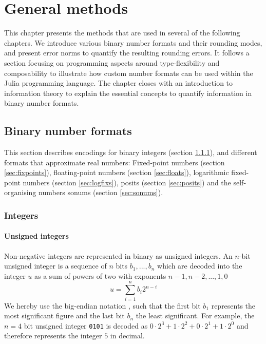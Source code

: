 \chapter{General methods}
\label{chap:methods}

This chapter presents the methods that are used in several of the following chapters. We introduce various binary number formats and
their rounding modes, and present error norms to quantify the resulting rounding errors. It follows a section focusing on
programming aspects around type-flexibility and composability to illustrate how custom number formats can be used within
the Julia programming language. The chapter closes with an introduction to information theory to explain the essential concepts
to quantify information in binary number formats.

\section{Binary number formats}
\label{sec:numbers}

This section describes encodings for binary integers (section \ref{sec:integers}), and different formats that approximate real numbers:
Fixed-point numbers (section \ref{sec:fixpoints}),
floating-point numbers (section \ref{sec:floats}),
logarithmic fixed-point numbers (section \ref{sec:logfixs}),
posits (section \ref{sec:posits}) and the self-organising numbers sonums (section \ref{sec:sonums}).

\subsection{Integers}
\label{sec:integers}

\subsubsection{Unsigned integers}

Non-negative integers are represented in binary as unsigned integers. An $n$-bit unsigned integer is a sequence of $n$ bits
$b_1, ..., b_n$ which are decoded into the integer $u$ as a sum of powers of two with exponents $n-1,n-2,...,1,0$
\begin{equation}
	u = \sum_{i=1}^{n} b_i 2^{n-i}
	\label{eq:uint}
\end{equation}
We hereby use the big-endian notation \citep{Cohen1981,James1990}, such that the first bit $b_1$ represents the most significant figure and the last bit $b_n$ the
least significant. For example, the $n=4$ bit unsigned integer \texttt{0101} is decoded as
$0 \cdot 2^3 + 1 \cdot 2^2 + 0 \cdot 2^1 + 1 \cdot 2^0$ and therefore represents the integer $5$ in decimal.

